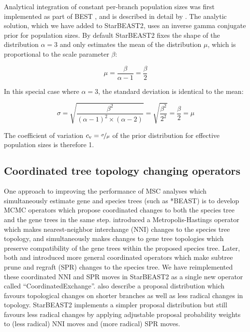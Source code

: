 \documentclass[12pt]{article}
\begin{document}
Analytical integration of constant per-branch population sizes was first
implemented as part of BEST \citep{EVO:EVO414}, and is described in detail by \cite{Jones2016}. The analytic solution, which we
have added to StarBEAST2, uses an inverse gamma conjugate prior for population
sizes. By default StarBEAST2 fixes the shape of the distribution $\alpha = 3$
and only estimates the mean of the distribution $\mu$, which is proportional to the
scale parameter $\beta$:

\begin{equation}
\mu = \frac{\beta}{\alpha - 1} = \frac{\beta}{2}
\end{equation}

In this special case where $\alpha = 3$, the standard deviation is identical to
the mean:

\begin{equation}
\sigma = \sqrt{\frac{\beta^2}{(\alpha - 1)^2 \times (\alpha - 2)}} = \sqrt{\frac{\beta^2}{2^2}} = \frac{\beta}{2} = \mu
\end{equation}

The coefficient of variation $c_\mathrm{v} = \nicefrac{\sigma}{\mu}$ of the
prior distribution for effective population sizes is therefore 1.

\subsection{Coordinated tree topology changing operators}

One approach to improving the performance of MSC analyses which simultaneously
estimate gene and species trees (such as *BEAST) is to develop MCMC operators
which propose coordinated changes to both the species tree and the gene trees in
the same step. \cite{Yang01122014} introduced a Metropolis-Hastings \citep[MH;][]{Metropolis1953, Hastings1970}
operator which makes nearest-neighbor interchange (NNI) changes to the species
tree topology, and simultaneously makes changes to gene tree topologies which
preserve compatibility of the gene trees within the proposed species tree.
Later, both \cite{Jones2016} and \cite{2015arXiv151203843R} introduced more
general coordinated operators which make subtree prune and regraft (SPR) changes
to the species tree. We have reimplemented these coordinated NNI and SPR moves
in StarBEAST2 as a single new operator called ``CoordinatedExchange''.
\cite{2015arXiv151203843R} also describe a proposal distribution which favours
topological changes on shorter branches as well as less radical changes in
topology. StarBEAST2 implements a simpler proposal distribution but still
favours less radical changes by applying adjustable proposal probability weights
to (less radical) NNI moves and (more radical) SPR moves.
\end{document}
